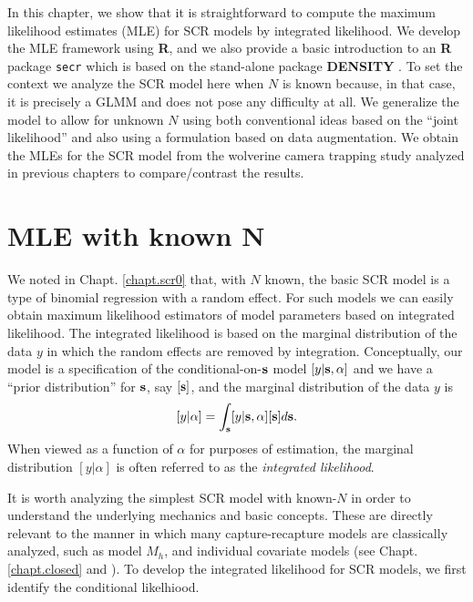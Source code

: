 In this chapter, we show that it is
straightforward to compute the maximum likelihood estimates (MLE) for
SCR models by integrated likelihood. We develop the MLE framework
using {\bf R}, and we also provide a basic introduction to an {\bf R} package
\mbox{\tt secr} \citep{efford:2011} which is based on the stand-alone
package 
{\bf DENSITY} \citep{efford_etal:2004}.
 To set the context we analyze the SCR model
here when $N$ is known because, in that case, it is precisely a GLMM and
does not pose any difficulty at all. We generalize the model to allow
for unknown $N$ using both conventional ideas based on the ``joint
likelihood'' \citep[e.g.,][]{borchers_etal:2002}
and also using a formulation
based on data augmentation.  We obtain the MLEs for 
the SCR model from the wolverine camera trapping study \citep{magoun_etal:2011}
 analyzed in previous chapters to compare/contrast the
results.

\section{MLE with known N}

We noted in Chapt. \ref{chapt.scr0} that, with $N$ known, the basic SCR model is a
type of binomial regression with a random effect. For such models we
can easily obtain maximum likelihood estimators of model parameters
based on integrated likelihood. The integrated likelihood is based on
the marginal distribution of the data $y$ in which the random effects
are removed by integration. Conceptually, our model is a specification
of the conditional-on-${\bf s}$ model $[y|{\bf s},\alpha]$ and we have
a ``prior distribution'' for ${\bf s}$, say $[{\bf s}]$, and the
marginal distribution of the data $y$ is
\[
[y|\alpha] =  \int_{\bf s} [y|{\bf s},\alpha][{\bf s}] d{\bf s}.
\]
When viewed as a function of $\alpha$ for purposes of estimation, the
marginal distribution $[y|\alpha]$ is often referred to as the {\it
  integrated likelihood}.

It is worth analyzing 
the simplest SCR model with known-$N$ in order to understand the
underlying mechanics and basic concepts. These are directly relevant to
the manner in which many capture-recapture models are classically
analyzed, such as model $M_h$, and individual covariate models (see
Chapt. \ref{chapt.closed} and  \citet[][chapt. 6]{royle_dorazio:2008}). To develop the integrated
likelihood for SCR models, we first identify the conditional
likelhiood. 

